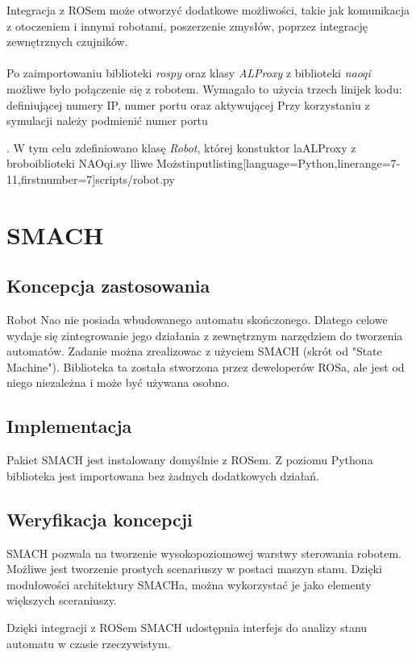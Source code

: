Integracja z ROSem może otworzyć dodatkowe możliwości, takie jak komunikacja z otoczeniem i innymi robotami, poszerzenie zmysłów, poprzez integrację zewnętrznych czujników. 
\\\\
Po zaimportowaniu biblioteki \textit{rospy} oraz klasy \textit{ALProxy} z biblioteki \textit{naoqi} możliwe było połączenie się z robotem. Wymagało to użycia trzech linijek kodu: definiującej numery IP, numer portu oraz aktywującej  Przy korzystaniu z symulacji należy podmienić numer portu

\ktem. W tym celu zdefiniowano klasę \textit{Robot}, której konstuktor laALProxy z broboiblioteki NAOqi.sy lliwe Możstinputlisting[language=Python,linerange=7-11,firstnumber=7]{scripts/robot.py}



\section{SMACH}

\subsection{Koncepcja zastosowania}
Robot Nao nie posiada wbudowanego automatu skończonego. Dlatego celowe wydaje się zintegrowanie jego działania z zewnętrznym narzędziem do tworzenia automatów. 
Zadanie można zrealizowac z użyciem SMACH (skrót od "State Machine"). Biblioteka ta została stworzona przez deweloperów ROSa, ale jest od niego niezależna i może być używana osobno. 

\subsection{Implementacja}
Pakiet SMACH jest instalowany domyślnie z ROSem. Z poziomu Pythona biblioteka jest importowana bez żadnych dodatkowych działań.

\subsection{Weryfikacja koncepcji}
SMACH pozwala na tworzenie wysokopoziomowej warstwy sterowania robotem. Możliwe jest tworzenie prostych scenariuszy w postaci maszyn stanu. Dzięki modułowości architektury SMACHa, można wykorzystać je jako elementy większych sceraniuszy. 

Dzięki integracji z ROSem SMACH udostępnia interfejs do analizy stanu automatu w czasie rzeczywistym. 

